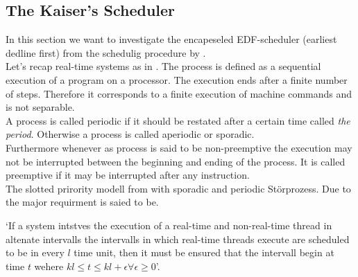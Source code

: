 \subsection{The Kaiser's Scheduler}


In this section we want to investigate the encapeseled EDF-scheduler (earliest dedline first) from the schedulig procedure by \cite{K}. \\

Let's recap \glspl{real-time system} as in \cite{KBK}.
The process is defined as a sequential execution of a program on a processor. The execution ends after a finite number of steps. 
Therefore it corresponds to a finite execution of machine commands and is not separable. \\
A process is called periodic if it should be restated after a certain time called {\itshape the period}. Otherwise a process is called aperiodic or sporadic.\\

Furthermore whenever as process is said to be  non-preemptive the execution may not be interrupted between the beginning and ending of the process. It is called preemptive if it may be interrupted after any instruction.\\  
 
The slotted prirority modell from \cite{B} with \cite[]{K} sporadic and periodic Störprozess.
Due to \cite[Requirements]{B} the major requirment is saied to be.

`If a system intstves the execution of a real-time and non-real-time thread in altenate intervalls the intervalls in which real-time threads execute are scheduled to be in every $l$ time unit, then it must be ensured that the intervall begin at time $t$ wehere $kl \leq t \leq kl+\epsilon \forall
 \epsilon \geq 0$'.
  	    
   
   
   
